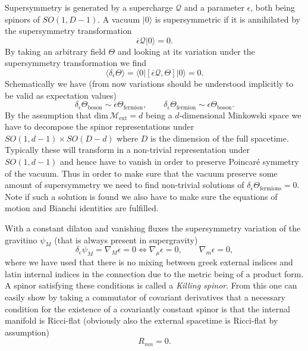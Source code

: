 Supersymmetry is generated by a supercharge $\mathcal{Q}$ and a parameter $\epsilon$, both being spinors of $SO(1,D-1)$. A vacuum $|0\rangle$ is supersymmetric if it is annihilated by the supersymmetry transformation
\begin{equation}
    \overbar{\epsilon}\mathcal{Q}|0\rangle = 0.
\end{equation}
By taking an arbitrary field $\Theta$ and looking at its variation under the supersymmetry transformation we find 
\begin{equation}
    \langle \delta_{\epsilon}\Theta\rangle = \langle 0|\left[\overbar{\epsilon}\mathcal{Q},\Theta\right]|0\rangle = 0.
\end{equation}
Schematically we have (from now variations should be understood implicitly to be valid as expectation values)
\begin{equation}
    \delta_\epsilon \Theta_{\text{boson}} \sim \overbar{\epsilon}\Theta_{\text{fermion}},\qquad \delta_\epsilon \Theta_{\text{fermion}}\sim \epsilon\Theta_{\text{boson}}.
\end{equation}
By the assumption that $\text{dim}\,\mathcal{M}{_{\text{ext}}}=d$ being a $d$-dimensional Minkowski space we have to decompose the spinor representations under $SO(1,d-1)\times SO(D-d)$ where $D$ is the dimension of the full spacetime. Typically these will transform in a non-trivial representation under $SO(1,d-1)$ and hence have to vanish in order to preserve Poincaré symmetry of the vacuum. Thus in order to make sure that the vacuum preserve some amount of supersymmetry we need to find non-trivial solutions of $\delta_\epsilon\Theta_{\text{fermions}}=0$. Note if such a solution is found we also have to make sure the equations of motion and Bianchi identities are fulfilled. 

With a constant dilaton and vanishing fluxes the supersymmetry variation of the gravitino $\psi_M$ (that is always present in supergravity) \cite{Blumenhagen2013}
\begin{equation}
    \delta_\epsilon\psi_M = \nabla_M\epsilon = 0 \Leftrightarrow \nabla_\mu \epsilon = 0,\qquad \nabla_m\epsilon = 0,
\end{equation}
where we have used that there is no mixing between greek external indices and latin internal indices in the connection due to the metric being of a product form. A spinor satisfying these conditions is called a \emph{Killing spinor}. From this one can easily show by taking a commutator of covariant derivatives that a necessary condition for the existence of a covariantly constant spinor is that the internal manifold is Ricci-flat (obviously also the external spacetime is Ricci-flat by assumption)
\begin{equation}
    R_{mn} = 0.
\end{equation}

